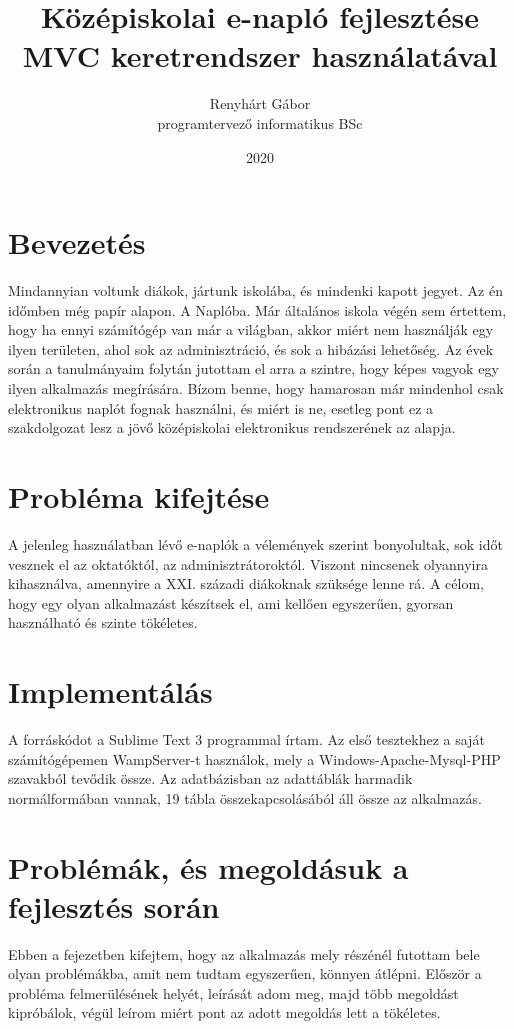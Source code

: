 \documentclass[
]{thesis-ekf}
\begin{document}
\title{Középiskolai e-napló fejlesztése MVC keretrendszer használatával}
\author{Renyhárt Gábor\\programtervező informatikus BSc}
\date{2020}
\maketitle

\tableofcontents

\chapter*{Bevezetés}
Mindannyian voltunk diákok, jártunk iskolába, és mindenki kapott jegyet. Az én időmben még papír alapon. A Naplóba. Már általános iskola végén sem értettem, hogy ha ennyi számítógép van már a világban, akkor miért nem használják egy ilyen területen, ahol sok az adminisztráció, és sok a hibázási lehetőség. Az évek során a tanulmányaim folytán jutottam el arra a szintre, hogy képes vagyok egy ilyen alkalmazás megírására.
Bízom benne, hogy hamarosan már mindenhol csak elektronikus naplót fognak használni, és miért is ne, esetleg pont ez a szakdolgozat lesz a jövő középiskolai elektronikus rendszerének az alapja.


\chapter{Probléma kifejtése}
A jelenleg használatban lévő e-naplók a vélemények szerint bonyolultak, sok időt vesznek el az oktatóktól, az adminisztrátoroktól. Viszont nincsenek olyannyira kihasználva, amennyire a XXI. századi diákoknak szüksége lenne rá. A célom, hogy egy olyan alkalmazást készítsek el, ami kellően egyszerűen, gyorsan használható és szinte tökéletes.
\chapter{Implementálás}
A forráskódot a Sublime Text 3 programmal írtam. Az első tesztekhez a saját számítógépemen WampServer-t használok, mely a Windows-Apache-Mysql-PHP szavakból tevődik össze. Az adatbázisban az adattáblák harmadik normálformában vannak, 19 tábla összekapcsolásából áll össze az alkalmazás.
\chapter{Problémák, és megoldásuk a fejlesztés során}
Ebben a fejezetben kifejtem, hogy az alkalmazás mely részénél futottam bele olyan problémákba, amit nem tudtam egyszerűen, könnyen átlépni. Először a probléma felmerülésének helyét, leírását adom meg, majd több megoldást kipróbálok, végül leírom miért pont az adott megoldás lett a tökéletes.
\end{document}
